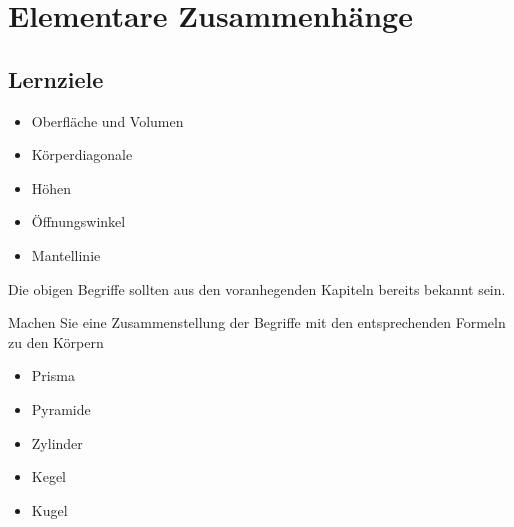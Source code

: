 \section{Elementare Zusammenhänge}
\sectuntertitel{}


\subsection*{Lernziele}
\begin{itemize}
\item Oberfläche und Volumen
\item Körperdiagonale
\item Höhen
\item Öffnungswinkel
\item Mantellinie
\end{itemize}

Die obigen Begriffe sollten aus den voranhegenden Kapiteln bereits
bekannt sein.

Machen Sie eine Zusammenstellung der Begriffe mit den entsprechenden
Formeln zu den Körpern
\begin{itemize}
\item Prisma
\item Pyramide
\item Zylinder
\item Kegel
\item Kugel
\end{itemize}


\newpage
